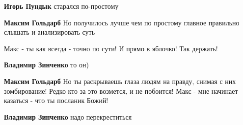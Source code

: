\begin{itemize}
\begin{itemize}
\textbf{Игорь Пундык} старался по-простому

 
\textbf{Максим Гольдарб} Но получилось лучше чем по простому главное правильно слышать и анализировать суть
\end{itemize}

 
Макс - ты как всегда - точно по сути! И прямо в яблочко! Так держать!

\begin{itemize}
 
\textbf{Владимир Зинченко} то он)

 
\textbf{Максим Гольдарб} Но ты раскрываешь глаза людям на правду, снимая с них
зомбирование! Редко кто за это возмется, и не побоится! Макс - мне начинает
казаться - что ты посланик Божий!

 
\textbf{Владимир Зинченко} надо перекреститься \Smiley[1.0][yellow]

 

\end{itemize}
\end{itemize}
